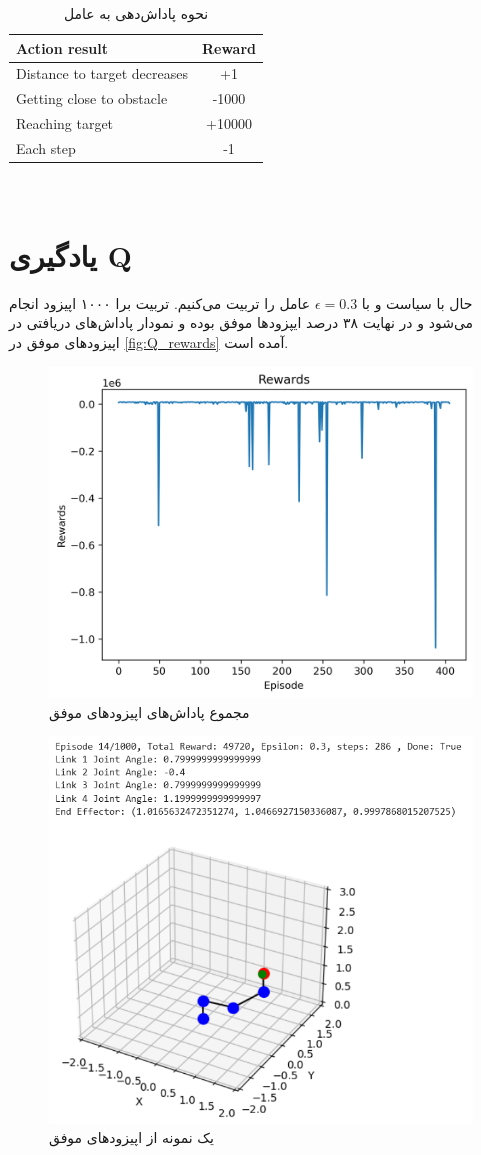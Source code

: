 \documentclass[11pt]{article}
\begin{document}
	\begin{table}[h!]
	\caption{نحوه پاداش‌دهی به عامل}
	\begin{latin}
		\centering
		\begin{tabular}{|l|c|}
			\hline
			\textbf{Action result} &  \textbf{Reward} \\ \hline
			Distance to target decreases &  +1  \\  \hline
			Getting close to obstacle &  -1000  \\  \hline
			Reaching target &  +10000 \\ \hline
			Each step &  -1 \\ \hline
		\end{tabular}
	\end{latin}
	\label{tab:rewarding} 
\end{table}\\

\section{یادگیری Q}
حال با سیاست 
و با
 $\epsilon = 0.3$
 عامل را تربیت می‌کنیم. تربیت برا ۱۰۰۰ اپیزود انجام می‌شود و در نهایت ۳۸ درصد ایپزود‌ها موفق بوده و نمودار پاداش‌های دریافتی در اپیزود‌های موفق در 
 \autoref{fig:Q_rewards}
 آمده است.
 	\begin{figure}[!h]
 	\centerline{\includegraphics[width=0.5\linewidth]{../Qrewards.png}}
 	\caption{مجموع پاداش‌های اپیزود‌های موفق}
 	\label{fig:Q_rewards}
 \end{figure}
 	\begin{figure}[!h]
 	\centerline{\includegraphics[width=0.5\linewidth]{../success.png}}
 	\caption{یک نمونه از اپیزود‌های موفق}
 	\label{fig:success}
 \end{figure}
\end{document}
